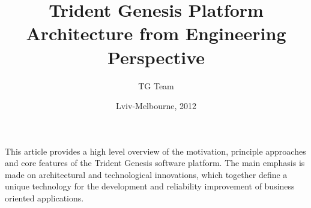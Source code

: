 \begin{titlepage}
\AddToShipoutPicture*{\BackgroundPic}
\title{Trident Genesis Platform Architecture from Engineering Perspective}
\author{TG Team}
\date{Lviv-Melbourne, 2012}
\maketitle
\clearpage
\AddToShipoutPicture*{\BackgroundPic}
  This article provides a high level overview of the motivation, principle approaches and core features of the Trident Genesis software platform.
  The main emphasis is made on architectural and technological innovations, which together define a unique technology for the development and reliability improvement of business oriented applications.

\clearpage
\AddToShipoutPicture*{\BackgroundPic}
\tableofcontents
\clearpage

\end{titlepage}